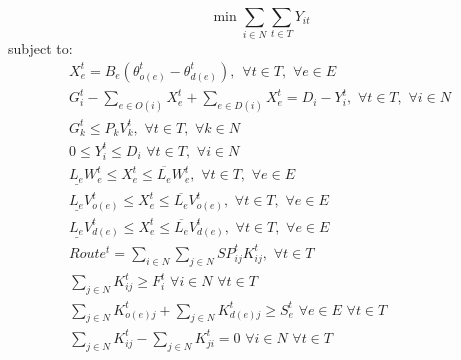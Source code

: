 \documentclass{article}
\begin{document}
		\begin{equation}
	\min \sum_{i \in N} \sum_{t \in T} Y_{it}
	\end{equation}
	subject to:
	\begin{eqnarray}
	X_e^t = B_e (\theta_{o(e)}^t - \theta_{d(e)}^t), \hspace{5pt} \forall t \in T, \hspace{4pt} \forall e \in E\\
	G_i^t - \sum_{e \in O(i)} X_e^t + \sum_{e \in D(i)} X_e^t = D_i-Y_i^t, \hspace{4pt} \forall t \in T, \hspace{4pt} \forall i \in N\\
	G_k^t \leq P_{k} V_{k}^t, \hspace{4pt} \forall t \in T, \hspace{4pt} \forall k \in N\\
	0\leq Y_i^t \leq D_i \hspace{4pt} \forall t \in T, \hspace{4pt} \forall i \in N\\
	\underline{L_e}W_{e}^t \leq X_{e}^t \leq \overline{L_e}W_{e}^t, \hspace{4pt} \forall t \in T, \hspace{4pt} \forall e \in E\\
	\underline{L_e}V_{o(e)}^t \leq X_{e}^t \leq \overline{L_e}V_{o(e)}^t, \hspace{4pt} \forall t \in T, \hspace{4pt} \forall e \in E\\
	\underline{L_e}V_{d(e)}^t \leq X_{e}^t \leq \overline{L_e}V_{d(e)}^t, \hspace{4pt} \forall t \in T, \hspace{4pt} \forall e \in E\\
	Route^t = \sum_{i \in N} \sum_{j \in N} SP_{ij}^t K_{ij}^{t},  \hspace{4pt} \forall t \in T\\
	\sum_{j \in N} K_{ij}^t \geq F_i^t \hspace{4pt} \forall i \in N \hspace{4pt} \forall t \in T\\
	\sum_{j \in N} K_{o(e)j}^t + \sum_{j \in N} K_{d(e)j}^t \geq S_e^t \hspace{4pt} \forall e \in E \hspace{4pt} \forall t \in T\\
	\sum_{j \in N} K_{ij}^t - \sum_{j \in N} K_{ji}^t = 0 \hspace{4pt} \forall i \in N \hspace{4pt} \forall t \in T\\

\end{eqnarray}
\end{document}
